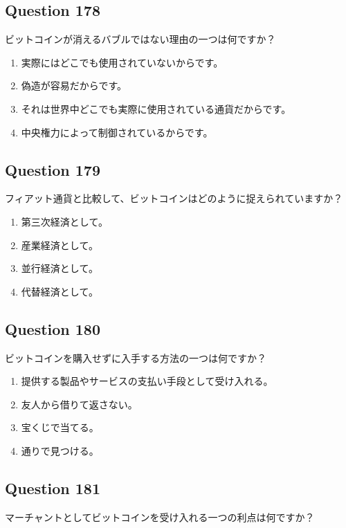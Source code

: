 \documentclass[12pt,a4paper]{article}
\begin{document}
\bigskip


\subsection*{Question 178}
ビットコインが消えるバブルではない理由の一つは何ですか？

\begin{enumerate}[label=\Alph*., leftmargin=*]
\item 実際にはどこでも使用されていないからです。
\item 偽造が容易だからです。
\item それは世界中どこでも実際に使用されている通貨だからです。
\item 中央権力によって制御されているからです。
\end{enumerate}

\bigskip


\subsection*{Question 179}
フィアット通貨と比較して、ビットコインはどのように捉えられていますか？

\begin{enumerate}[label=\Alph*., leftmargin=*]
\item 第三次経済として。
\item 産業経済として。
\item 並行経済として。
\item 代替経済として。
\end{enumerate}

\bigskip


\subsection*{Question 180}
ビットコインを購入せずに入手する方法の一つは何ですか？

\begin{enumerate}[label=\Alph*., leftmargin=*]
\item 提供する製品やサービスの支払い手段として受け入れる。
\item 友人から借りて返さない。
\item 宝くじで当てる。
\item 通りで見つける。
\end{enumerate}

\bigskip


\subsection*{Question 181}
マーチャントとしてビットコインを受け入れる一つの利点は何ですか？
\end{document}
